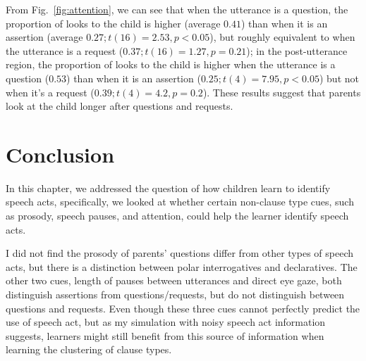 From Fig.~\ref{fig:attention}, we can see that when the utterance is a question, the proportion of looks to the child is higher (average $0.41$) than when it is an assertion (average $0.27; t(16) = 2.53, p <0.05$), but roughly equivalent to when the utterance is a request ($0.37; t(16)= 1.27, p=0.21$); in the post-utterance region, the proportion of looks to the child is higher when the utterance is a question ($0.53$) than when it is an assertion ($0.25; t(4) = 7.95, p<0.05$) but not when it's a request ($0.39; t(4) = 4.2, p=0.2$). These results suggest that parents look at the child longer after questions and requests. %

\section{Conclusion}
\label{sec:engsp:discussion}
In this chapter, we addressed the question of how children learn to identify speech acts, specifically, we looked at whether certain non-clause type cues, such as prosody, speech pauses, and attention, could help the learner identify speech acts. 

I did not find the prosody of parents' questions differ from other types of speech acts, but there is a distinction between polar interrogatives and declaratives. The other two cues, length of pauses between utterances and direct eye gaze, both distinguish assertions from questions/requests, but do not distinguish between questions and requests. Even though these three cues cannot perfectly predict the use of speech act, but as my simulation with noisy speech act information suggests, learners might still benefit from this source of information when learning the clustering of clause types.  

